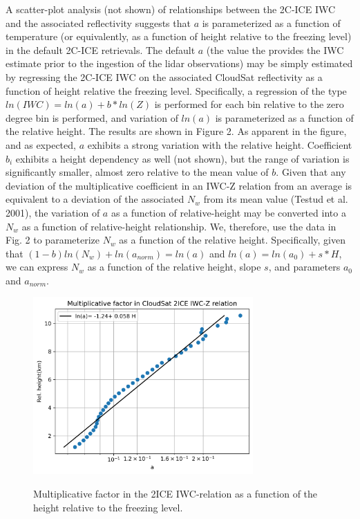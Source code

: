 \documentclass{ametsocV6.1}
\begin{document}
A scatter-plot analysis (not shown) of relationships between the 2C-ICE IWC and the associated reflectivity suggests that
$a$ is parameterized as a function of temperature (or equivalently, as a function of height relative to the freezing level) in 
the default 2C-ICE retrievals. The default $a$ (the value the provides the IWC estimate prior to the ingestion of the lidar
observations) may be simply estimated by regressing the 2C-ICE IWC on the associated CloudSat reflectivity as a function of 
height relative the freezing level. Specifically, a regression of the type $ln(IWC)=ln(a)+b*ln(Z)$ is performed for 
each bin relative to the zero degree bin is performed, and variation of $ln(a)$ is parameterized as a function of the
relative height.  The results are shown in Figure 2. As apparent in the figure, and as expected, $a$ exhibits a strong variation 
with the relative height.  Coefficient $b_i$ exhibits a height dependency as well (not shown), but the range of variation is 
significantly smaller, almost zero relative to the mean value of $b$. Given that any deviation of the multiplicative coefficient in 
an IWC-Z relation from an average is equivalent to a deviation of the associated $N_w$ from its mean value 
(Testud et al. 2001), the variation of $a$ as a function of relative-height may be converted into a $N_w$ 
as a function of relative-height relationship.  We, therefore, use the data in Fig. 2 to parameterize $N_w$ as a 
function of the relative height.  Specifically, given that $(1-b)ln(N_w)+ln(a_{norm})=ln(a)$ and $ln(a)=ln(a_0)+s*H$, we 
can express $N_w$ as a function of the relative height, slope $s$, and parameters $a_0$ and $a_{norm}$.

\begin{figure}[t]
    \centering
    \includegraphics[width=0.75\textwidth,angle=0]{./Figs/fig02.rev.png}\\
    \caption{Multiplicative factor in the 2ICE IWC-relation as a function of the height relative to the freezing level.}\label{f2}
\end{figure}
\end{document}
